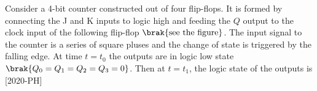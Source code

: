 \iffalse
    \title{Assignment}
    \author{EE24BTECH11066}
    \section{ph}
    \chapter{2020}
  \fi
\item Consider a 4-bit counter constructed out of four flip-flops. It is formed by connecting the J and K inputs to logic high and feeding the $Q$ output to the clock input of the following flip-flop $\brak{\text{see the figure}}$. The input signal to the counter is a series of square pluses and the change of state is triggered by the falling edge. At time $t=t_0$ the outputs are in logic low state $\brak{Q_0=Q_1=Q_2=Q_3=0}$. Then at $t=t_1$, the logic state of the outputs is \hfill{[2020-PH]}\\
